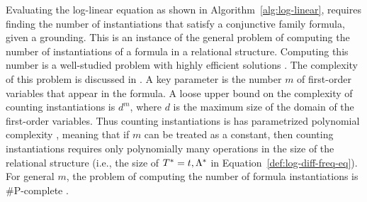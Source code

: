 \documentclass[runningheads,a4paper]{llncs}
\renewcommand{\Qconj}{\Appendterm{\FG{\TT} = \TV} {\QC}} %
\begin{document}
Evaluating the log-linear equation as shown in Algorithm~\ref{alg:log-linear}, requires finding the number of instantiations that satisfy a conjunctive family formula, given a grounding. This is an instance of the general problem of computing the number of instantiations of a formula in a relational structure. Computing this number is a well-studied problem  with highly efficient solutions \cite{Vardi1995,Schulte2014}.  
The complexity of this problem is discussed in \cite{Schulte2014}. 
A key parameter is the number $m$ of first-order variables that appear in the formula. A loose upper bound on the complexity of counting instantiations is $d^{m}$, where $d$ is the maximum size of the domain of the first-order variables. Thus counting instantiations is has parametrized polynomial complexity \cite{Flum2006}, meaning that if $m$ can be treated as a constant, then counting instantiations requires only polynomially many operations in the size of the relational structure (i.e., the size of $\Qconj$ in Equation~\ref{def:log-diff-freq-eq}). For general $m$, the problem of computing the number of formula instantiations is \#P-complete \cite[Prop.12.4]{Domingos2007}.


 
 
%
%
%
%
\end{document}
